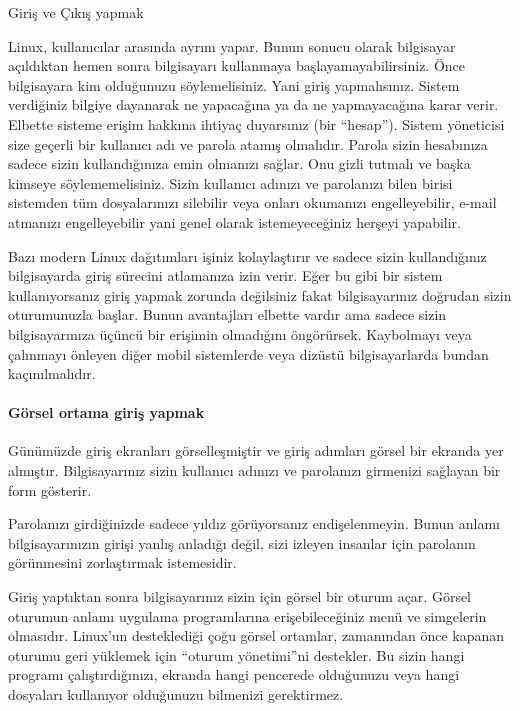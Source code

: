 \begin{section}{Giriş ve Çıkış yapmak}

Linux, kullanıcılar arasında ayrım yapar. Bunun sonucu olarak bilgisayar açıldıktan hemen sonra bilgisayarı kullanmaya başlayamayabilirsiniz. Önce bilgisayara kim olduğunuzu söylemelisiniz. Yani giriş yapmalısınız. Sistem verdiğiniz bilgiye dayanarak ne yapacağına ya da ne yapmayacağına karar verir. Elbette sisteme erişim hakkına ihtiyaç duyarsınız (bir “hesap”). Sistem yöneticisi size geçerli bir kullanıcı adı ve parola atamış olmalıdır. Parola sizin hesabınıza sadece sizin kullandığınıza emin olmanızı sağlar. Onu gizli tutmalı ve başka kimseye söylememelisiniz. Sizin kullanıcı adınızı ve parolanızı bilen birisi sistemden tüm dosyalarınızı silebilir veya onları okumanızı engelleyebilir, e-mail atmanızı engelleyebilir yani genel olarak istemeyeceğiniz herşeyi yapabilir. 

Bazı modern Linux dağıtımları işiniz kolaylaştırır ve sadece sizin kullandığınız bilgisayarda giriş sürecini atlamanıza izin verir. Eğer bu gibi bir sistem kullanıyorsanız giriş yapmak zorunda değilsiniz fakat bilgisayarınız doğrudan sizin oturumunuzla başlar. Bunun avantajları elbette vardır ama sadece sizin bilgisayarınıza üçüncü bir erişimin olmadığını öngörürsek. Kaybolmayı veya çalınmayı önleyen diğer mobil sistemlerde veya dizüstü bilgisayarlarda bundan kaçınılmalıdır. 

\paragraph{Görsel ortama giriş yapmak}{Günümüzde giriş ekranları görselleşmiştir ve giriş adımları görsel bir ekranda yer almıştır. Bilgisayarınız sizin kullanıcı adınızı ve parolanızı girmenizi sağlayan bir form gösterir.}

Parolanızı girdiğinizde sadece yıldız görüyorsanız endişelenmeyin. Bunun anlamı bilgisayarınızın girişi yanlış anladığı değil, sizi izleyen insanlar için parolanın görünmesini zorlaştırmak istemesidir. 

Giriş yaptıktan sonra bilgisayarınız sizin için görsel bir oturum açar. Görsel oturumun anlamı uygulama programlarına erişebileceğiniz menü ve simgelerin olmasıdır. Linux’un desteklediği çoğu görsel ortamlar, zamanından önce kapanan oturumu geri yüklemek için “oturum yönetimi”ni destekler. Bu sizin hangi programı çalıştırdığınızı, ekranda hangi pencerede olduğunuzu veya hangi dosyaları kullanıyor olduğunuzu bilmenizi gerektirmez. 


\end{section}
